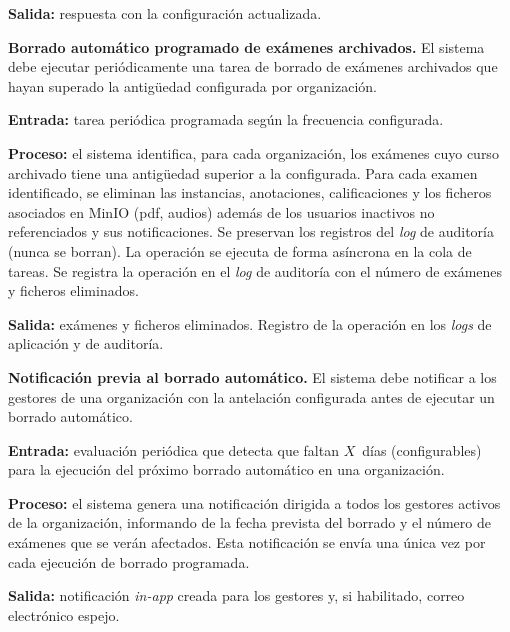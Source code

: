 \begin{functional}
    \textbf{Salida:} respuesta con la configuración actualizada.

    \item \textbf{Borrado automático programado de exámenes archivados.}
    \label{rf:config:auto_delete}
    El sistema debe ejecutar periódicamente una tarea de borrado de exámenes archivados que
    hayan superado la antigüedad configurada por organización.

    \textbf{Entrada:} tarea periódica programada según la frecuencia configurada.

    \textbf{Proceso:} el sistema identifica, para cada organización, los exámenes cuyo curso
    archivado tiene una antigüedad superior a la configurada. Para cada examen identificado,
    se eliminan las instancias, anotaciones, calificaciones y los ficheros asociados en
    MinIO (\acs{pdf}, audios) además de los usuarios inactivos no referenciados y sus
    notificaciones. Se preservan los registros del \textit{log} de auditoría
    (nunca se borran). La operación se ejecuta de forma asíncrona en la cola de tareas. Se
    registra la operación en el \textit{log} de auditoría con el número de exámenes y
    ficheros eliminados.

    \textbf{Salida:} exámenes y ficheros eliminados. Registro de la operación en los
    \textit{logs} de aplicación y de auditoría.

    \item \textbf{Notificación previa al borrado automático.}
    \label{rf:config:delete_warning}
    El sistema debe notificar a los gestores de una organización con la antelación
    configurada antes de ejecutar un borrado automático.

    \textbf{Entrada:} evaluación periódica que detecta que faltan $X$~días (configurables)
    para la ejecución del próximo borrado automático en una organización.

    \textbf{Proceso:} el sistema genera una notificación dirigida a todos los gestores
    activos de la organización, informando de la fecha prevista del borrado y el número de
    exámenes que se verán afectados. Esta notificación se envía una única vez por cada
    ejecución de borrado programada.

    \textbf{Salida:} notificación \textit{in-app} creada para los gestores y, si habilitado,
    correo electrónico espejo.


\end{functional}
